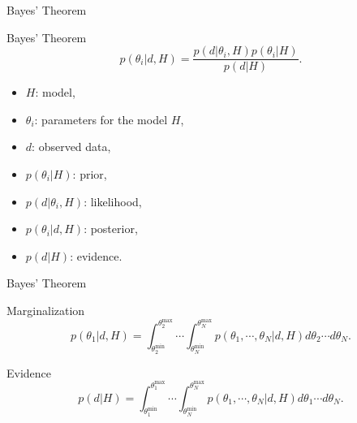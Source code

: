 \documentclass[xcolor=dvipsnames]{beamer}
\begin{document}
\begin{frame}[t]{Bayes' Theorem}
  \begin{block}{Bayes' Theorem}
    \begin{equation*}
      p(\theta_i | d, H) = \frac{p(d | \theta_i, H) p(\theta_i | H)}{p(d | H)}.
    \end{equation*}
  \end{block}
  \begin{itemize}
    \item $H$: model,
    \item $\theta_i$: parameters for the model $H$,
    \item $d$: observed data,
    \item $p(\theta_i | H)$: prior,
    \item $p(d | \theta_i, H)$: likelihood,
    \item $p(\theta_i | d, H)$: posterior,
    \item $p(d | H)$: evidence.
  \end{itemize}
\end{frame}

\begin{frame}[t]{Bayes' Theorem}
  \begin{block}{Marginalization}
    \begin{equation*}
      p(\theta_1 | d, H) = \int_{\theta_2^\text{min}}^{\theta_2^\text{max}} \cdots \int_{\theta_N^\text{min}}^{\theta_N^\text{max}} p(\theta_1, \cdots, \theta_N | d, H) d\theta_2 \cdots d\theta_N.
    \end{equation*}
  \end{block}
  \begin{block}{Evidence}
    \begin{equation*}
      p(d | H) = \int_{\theta_1^\text{min}}^{\theta_1^\text{max}} \cdots \int_{\theta_N^\text{min}}^{\theta_N^\text{max}} p(\theta_1, \cdots, \theta_N | d, H) d\theta_1 \cdots d\theta_N.
    \end{equation*}
  \end{block}
\end{frame}
\end{document}
